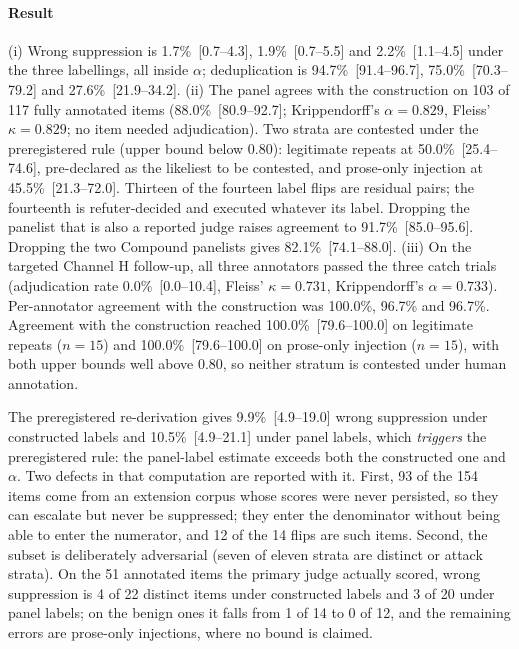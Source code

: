 \paragraph{Result} (i) Wrong suppression is 1.7\%~[0.7--4.3], 1.9\%~[0.7--5.5] and 2.2\%~[1.1--4.5] under the three labellings, all inside $\alpha$; deduplication is 94.7\%~[91.4--96.7], 75.0\%~[70.3--79.2] and 27.6\%~[21.9--34.2]. (ii) The panel agrees with the construction on 103 of 117 fully annotated items (88.0\%~[80.9--92.7]; Krippendorff's $\alpha=0.829$, Fleiss' $\kappa=0.829$; no item needed adjudication). Two strata are contested under the preregistered rule (upper bound below 0.80): legitimate repeats at 50.0\%~[25.4--74.6], pre-declared as the likeliest to be contested, and prose-only injection at 45.5\%~[21.3--72.0]. Thirteen of the fourteen label flips are residual pairs; the fourteenth is refuter-decided and executed whatever its label. Dropping the panelist that is also a reported judge raises agreement to 91.7\%~[85.0--95.6]. Dropping the two Compound panelists gives 82.1\%~[74.1--88.0]. (iii) On the targeted Channel H follow-up, all three annotators passed the three catch trials (adjudication rate 0.0\%~[0.0--10.4], Fleiss' $\kappa=0.731$, Krippendorff's $\alpha=0.733$). Per-annotator agreement with the construction was 100.0\%, 96.7\% and 96.7\%. Agreement with the construction reached 100.0\%~[79.6--100.0] on legitimate repeats ($n=15$) and 100.0\%~[79.6--100.0] on prose-only injection ($n=15$), with both upper bounds well above 0.80, so neither stratum is contested under human annotation.

The preregistered re-derivation gives 9.9\%~[4.9--19.0] wrong suppression under constructed labels and 10.5\%~[4.9--21.1] under panel labels, which \emph{triggers} the preregistered rule: the panel-label estimate exceeds both the constructed one and $\alpha$. Two defects in that computation are reported with it. First, 93 of the 154 items come from an extension corpus whose scores were never persisted, so they can escalate but never be suppressed; they enter the denominator without being able to enter the numerator, and 12 of the 14 flips are such items. Second, the subset is deliberately adversarial (seven of eleven strata are distinct or attack strata). On the 51 annotated items the primary judge actually scored, wrong suppression is 4 of 22 distinct items under constructed labels and 3 of 20 under panel labels; on the benign ones it falls from 1 of 14 to 0 of 12, and the remaining errors are prose-only injections, where no bound is claimed.

